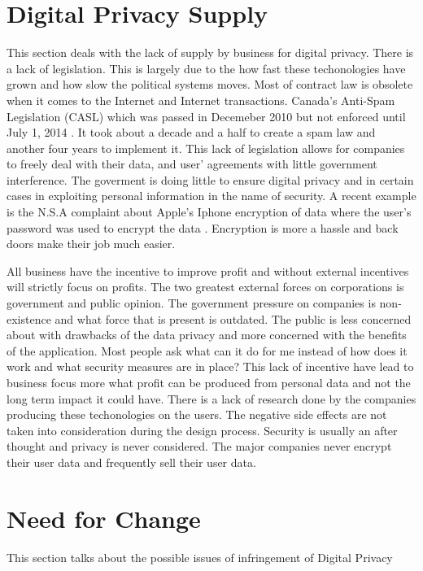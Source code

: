\documentclass[12pt]{article}
\begin{document}
\section{Digital Privacy Supply}\label{sec:supply}
This section deals with the lack of supply by business for digital privacy.
There is a lack of legislation. This is largely due to the how fast these techonologies have grown and how slow the political systems moves. Most of contract law is obsolete when it comes to the Internet and Internet transactions. Canada’s Anti-Spam Legislation (CASL) which was passed in Decemeber 2010 but not enforced until July 1, 2014 \cite{FastFacts}. It took about a decade and a half to create a spam law and another four years to implement it.
This lack of legislation allows for companies to freely deal with their data, and user' agreements with little government interference. The goverment is doing little to ensure digital privacy and in certain cases in exploiting personal information in the name of security. A recent example is the N.S.A complaint about Apple's Iphone encryption of data where the user's password was used to encrypt the data \cite{Schneier}. Encryption is more a hassle and back doors make their job much easier.

All business have the incentive to improve profit and without external incentives will strictly focus on profits. The two greatest external forces on corporations is government and public opinion. The government pressure on companies is non-existence and what force that is present is outdated. The public is less concerned about with drawbacks of the data privacy and more concerned with the benefits of the application. Most people ask what can it do for me instead of how does it work and what security measures are in place? This lack of incentive have lead to business focus more what profit can be produced from personal data and not the long term impact it could have. There is a lack of research done by the companies producing these techonologies on the users. The negative side effects are not taken into consideration during the design process. Security is usually an after thought and privacy is never considered. The major companies never encrypt their user data and frequently sell their user data.


\section{Need for Change}\label{sec:change}
This section talks about the possible issues of infringement of Digital Privacy
\end{document}
